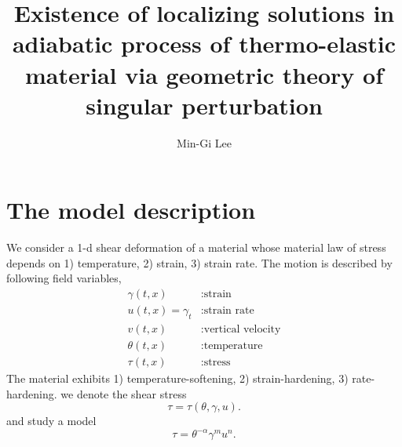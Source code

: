 \documentclass[a4paper,11pt]{article}
\begin{document}
\title{Existence of localizing solutions in adiabatic process of thermo-elastic material via geometric theory of singular perturbation}
\author{Min-Gi Lee\footnotemark[1]}
\date{}

\maketitle
\renewcommand{\thefootnote}{\fnsymbol{footnote}}
\renewcommand{\thefootnote}{\arabic{footnote}}


\maketitle

\tableofcontents

\section{The model description}
We consider a 1-d shear deformation of a material whose material law of stress depends on 1) temperature, 2) strain, 3) strain rate. The motion is described by following field variables,
\begin{equation} \label{eq:vars}
\begin{aligned}
 \gamma(t,x) &: \text{strain}\\
 u(t,x)=\gamma_t &: \text{strain rate}\\
 v(t,x) &: \text{vertical velocity}\\
 \theta(t,x) &: \text{temperature}\\
 \tau(t,x) &: \text{stress}
\end{aligned}
\end{equation}
The material exhibits 1) temperature-softening, 2) strain-hardening, 3) rate-hardening. we denote the shear stress
$$ \tau = \tau(\theta,\gamma,u). $$
and study a model
\begin{equation}
 \tau = \theta^{-\alpha}\gamma^m u^n. \label{eq:stresslaw}
\end{equation}
\end{document}

